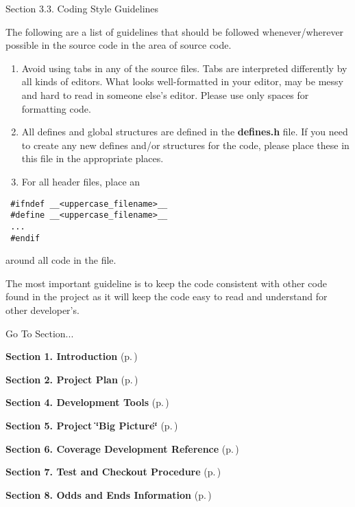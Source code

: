 \begin{Desc}
\item[Section 3.3.  Coding Style Guidelines]\par
 The following are a list of guidelines that should be followed whenever/wherever possible in the source code in the area of source code.

\begin{enumerate}
\item 
Avoid using tabs in any of the source files. Tabs are interpreted differently by all kinds of editors. What looks well-formatted in your editor, may be messy and hard to read in someone else's editor. Please use only spaces for formatting code.\item 
All defines and global structures are defined in the {\bf defines.h} file. If you need to create any new defines and/or structures for the code, please place these in this file in the appropriate places.\item 
For all header files, place an\end{enumerate}
\end{Desc}


\footnotesize\begin{verbatim} #ifndef __<uppercase_filename>__
 #define __<uppercase_filename>__
 ...
 #endif
\end{verbatim}\normalsize 


 around all code in the file.

 The most important guideline is to keep the code consistent with other code found in the project as it will keep the code easy to read and understand for other developer's.



\begin{Desc}
\item[Go To Section...]\par
\begin{CompactItemize}
\item 
{\bf Section 1.  Introduction} {\rm (p.\,\pageref{page_intro})}\item 
{\bf Section 2.  Project Plan} {\rm (p.\,\pageref{page_project_plan})}\item 
{\bf Section 4.  Development Tools} {\rm (p.\,\pageref{page_tools})}\item 
{\bf Section 5.  Project \char`\"{}Big Picture\char`\"{}} {\rm (p.\,\pageref{page_big_picture})}\item 
{\bf Section 6.  Coverage Development Reference} {\rm (p.\,\pageref{page_code_details})}\item 
{\bf Section 7.  Test and Checkout Procedure} {\rm (p.\,\pageref{page_testing})}\item 
{\bf Section 8.  Odds and Ends Information} {\rm (p.\,\pageref{page_misc})}\end{CompactItemize}
\end{Desc}
